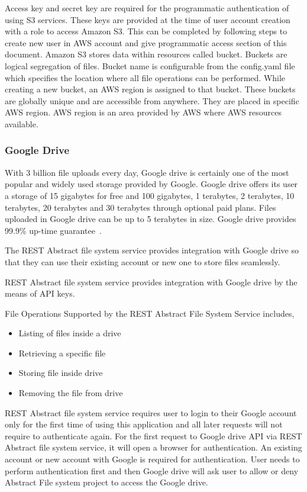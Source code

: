Access key and secret key are required for the programmatic
authentication of using S3 services. These keys are provided at the
time of user account creation with a role to access Amazon S3.  This
can be completed by following steps to create new user in AWS account
and give programmatic access section of this document.
Amazon S3 stores data within resources called bucket. Buckets are logical
segregation of files. Bucket name is configurable from the config.yaml file
which specifies the location where all file operations can be performed. 
While creating a new bucket, an AWS region is assigned to that bucket. These 
buckets are globally unique and are accessible from anywhere. They are
placed in specific AWS region. AWS region is an area provided by AWS where
AWS resources available.

\subsubsection{Google Drive}


With 3 billion file uploads every day, Google drive is certainly one of the 
most popular and widely used storage provided by Google. Google drive offers 
its user a storage of 15 gigabytes for free and 100 gigabytes, 1 terabytes, 2 
terabytes, 10 terabytes, 20 terabytes and 30 terabytes through optional paid 
plans. Files uploaded in Google drive can be up to 5 terabytes in size. Google 
drive provides 99.9\% up-time guarantee~\cite{hid-sp18-420-google-drive-wiki}. 

The REST Abstract file system service provides integration with Google
drive so that they can use their existing account or new one to store
files seamlessly.

REST Abstract file system service provides integration with 
Google drive by the means of API keys. 

File Operations Supported by the REST Abstract File System Service includes,
\begin{itemize}
    \item  Listing of files inside a drive
    \item  Retrieving a specific file 
    \item  Storing file inside drive
    \item  Removing the file from drive
\end{itemize}

REST Abstract file system service requires user to login to 
their Google account only for the first time of using 
this application and all later requests will not require to 
authenticate again.
For the first request to Google drive API via REST Abstract file 
system service, it will open a browser for authentication. 
An existing account or new account with Google is required 
for authentication.
User needs to perform authentication first and then Google drive will
ask user to allow or deny Abstract File system project to access 
the Google drive.

